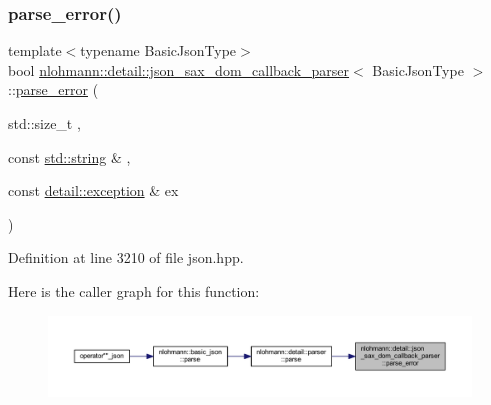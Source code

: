 \mbox{\label{classnlohmann_1_1detail_1_1json__sax__dom__callback__parser_aac6e64f0b59c9150cde974e182d5ecab}} 
\subsubsection{\texorpdfstring{parse\_error()}{parse\_error()}}
{\footnotesize\ttfamily template$<$typename Basic\+Json\+Type$>$ \\
bool \mbox{\hyperlink{classnlohmann_1_1detail_1_1json__sax__dom__callback__parser}{nlohmann\+::detail\+::json\+\_\+sax\+\_\+dom\+\_\+callback\+\_\+parser}}$<$ Basic\+Json\+Type $>$\+::\mbox{\hyperlink{classnlohmann_1_1detail_1_1parse__error}{parse\+\_\+error}} (\begin{DoxyParamCaption}\item[{std\+::size\+\_\+t}]{,  }\item[{const \mbox{\hyperlink{namespacenlohmann_1_1detail_a1ed8fc6239da25abcaf681d30ace4985ab45cffe084dd3d20d928bee85e7b0f21}{std\+::string}} \&}]{,  }\item[{const \mbox{\hyperlink{classnlohmann_1_1detail_1_1exception}{detail\+::exception}} \&}]{ex }\end{DoxyParamCaption})\hspace{0.3cm}{\ttfamily [inline]}}



Definition at line 3210 of file json.\+hpp.

Here is the caller graph for this function\+:
\nopagebreak
\begin{figure}[H]
\begin{center}
\leavevmode
\includegraphics[width=350pt]{classnlohmann_1_1detail_1_1json__sax__dom__callback__parser_aac6e64f0b59c9150cde974e182d5ecab_icgraph}
\end{center}
\end{figure}
\mbox{\label{classnlohmann_1_1detail_1_1json__sax__dom__callback__parser_a5255b98ba8282e3625968f91cff9d3d0}} 
